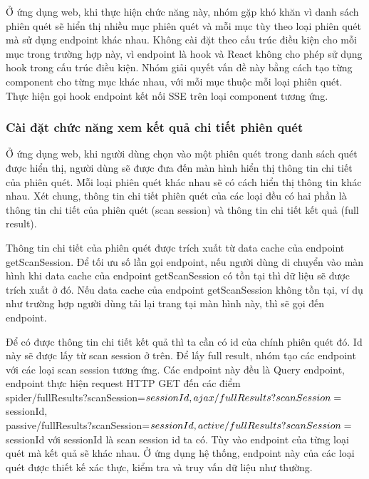 Ở ứng dụng web, khi thực hiện chức năng này, nhóm gặp khó khăn vì danh sách phiên quét sẽ hiển thị nhiều mục phiên quét và mỗi mục tùy theo loại phiên quét mà sử dụng endpoint khác nhau. Không cài đặt theo cấu trúc điều kiện cho mỗi mục trong trường hợp này, vì endpoint là hook và React không cho phép sử dụng hook trong cấu trúc điều kiện. Nhóm giải quyết vấn đề này bằng cách tạo từng component cho từng mục khác nhau, với mỗi mục thuộc mỗi loại phiên quét. Thực hiện gọi hook endpoint kết nối SSE trên loại component tương ứng.

\subsubsection{Cài đặt chức năng xem kết quả chi tiết phiên quét}

\tab Ở ứng dụng web, khi người dùng chọn vào một phiên quét trong danh sách quét được hiển thị, người dùng sẽ được đưa đến màn hình hiển thị thông tin chi tiết của phiên quét. Mỗi loại phiên quét khác nhau sẽ có cách hiển thị thông tin khác nhau. Xét chung, thông tin chi tiết phiên quét của các loại đều có hai phần là thông tin chi tiết của phiên quét (scan session) và thông tin chi tiết kết quả (full result).

Thông tin chi tiết của phiên quét được trích xuất từ data cache của endpoint getScanSession. Để tối ưu số lần gọi endpoint, nếu người dùng di chuyển vào màn hình khi data cache của endpoint getScanSession có tồn tại thì dữ liệu sẽ được trích xuất ở đó. Nếu data cache của endpoint getScanSession không tồn tại, ví dụ như trường hợp người dùng tải lại trang tại màn hình này, thì sẽ gọi đến endpoint.

Để có được thông tin chi tiết kết quả thì ta cần có id của chính phiên quét đó.
Id này sẽ được lấy từ scan session ở trên.
Để lấy full result, nhóm tạo các endpoint với các loại scan session tương ứng.
Các endpoint này đều là Query endpoint, endpoint thực hiện request HTTP GET đến các điểm \\
spider/fullResults?scanSession=${sessionId},\\
ajax/fullResults?scanSession=${sessionId},\\
passive/fullResults?scanSession=${sessionId},\\
active/fullResults?scanSession=${sessionId} với sessionId là scan session id ta có.
Tùy vào endpoint của từng loại quét mà kết quả sẽ khác nhau. Ở ứng dụng hệ thống, endpoint này của các loại quét được thiết kế xác thực, kiểm tra và truy vấn dữ liệu như thường.

